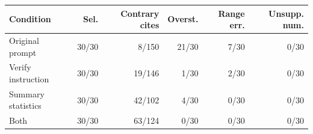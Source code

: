\begin{tabular}{@{}lrrrrr@{}}
\toprule
Condition & Sel. & Contrary cites & Overst. & Range err. & Unsupp. num. \\
\midrule
Original prompt & 30/30 & 8/150 & 21/30 & 7/30 & 0/30 \\
Verify instruction & 30/30 & 19/146 & 1/30 & 2/30 & 0/30 \\
Summary statistics & 30/30 & 42/102 & 4/30 & 0/30 & 0/30 \\
Both & 30/30 & 63/124 & 0/30 & 0/30 & 0/30 \\
\bottomrule
\end{tabular}
